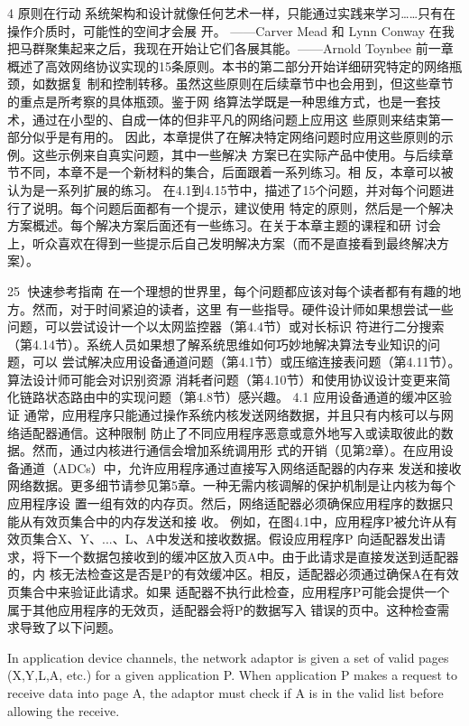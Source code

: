 4 原则在行动
系统架构和设计就像任何艺术一样，只能通过实践来学习……只有在操作介质时，可能性的空间才会展
开。
——Carver Mead 和 Lynn Conway
在我把马群聚集起来之后，我现在开始让它们各展其能。——Arnold Toynbee
前一章概述了高效网络协议实现的15条原则。本书的第二部分开始详细研究特定的网络瓶颈，如数据复
制和控制转移。虽然这些原则在后续章节中也会用到，但这些章节的重点是所考察的具体瓶颈。鉴于网
络算法学既是一种思维方式，也是一套技术，通过在小型的、自成一体的但非平凡的网络问题上应用这
些原则来结束第一部分似乎是有用的。
因此，本章提供了在解决特定网络问题时应用这些原则的示例。这些示例来自真实问题，其中一些解决
方案已在实际产品中使用。与后续章节不同，本章不是一个新材料的集合，后面跟着一系列练习。相
反，本章可以被认为是一系列扩展的练习。
在4.1到4.15节中，描述了15个问题，并对每个问题进行了说明。每个问题后面都有一个提示，建议使用
特定的原则，然后是一个解决方案概述。每个解决方案后面还有一些练习。在关于本章主题的课程和研
讨会上，听众喜欢在得到一些提示后自己发明解决方案（而不是直接看到最终解决方案）。

                                                  25
快速参考指南
在一个理想的世界里，每个问题都应该对每个读者都有有趣的地方。然而，对于时间紧迫的读者，这里
有一些指导。硬件设计师如果想尝试一些问题，可以尝试设计一个以太网监控器（第4.4节）或对长标识
符进行二分搜索（第4.14节）。系统人员如果想了解系统思维如何巧妙地解决算法专业知识的问题，可以
尝试解决应用设备通道问题（第4.1节）或压缩连接表问题（第4.11节）。算法设计师可能会对识别资源
消耗者问题（第4.10节）和使用协议设计变更来简化链路状态路由中的实现问题（第4.8节）感兴趣。
4.1 应用设备通道的缓冲区验证
通常，应用程序只能通过操作系统内核发送网络数据，并且只有内核可以与网络适配器通信。这种限制
防止了不同应用程序恶意或意外地写入或读取彼此的数据。然而，通过内核进行通信会增加系统调用形
式的开销（见第2章）。在应用设备通道（ADCs）中，允许应用程序通过直接写入网络适配器的内存来
发送和接收网络数据。更多细节请参见第5章。一种无需内核调解的保护机制是让内核为每个应用程序设
置一组有效的内存页。然后，网络适配器必须确保应用程序的数据只能从有效页集合中的内存发送和接
收。
例如，在图4.1中，应用程序P被允许从有效页集合X、Y、...、L、A中发送和接收数据。假设应用程序P
向适配器发出请求，将下一个数据包接收到的缓冲区放入页A中。由于此请求是直接发送到适配器的，内
核无法检查这是否是P的有效缓冲区。相反，适配器必须通过确保A在有效页集合中来验证此请求。如果
适配器不执行此检查，应用程序P可能会提供一个属于其他应用程序的无效页，适配器会将P的数据写入
错误的页中。这种检查需求导致了以下问题。




In application device channels, the network adaptor is given a set of valid pages (X,Y,L,A, etc.)
for a given application P. When application P makes a request to receive data into page A, the
adaptor must check if A is in the valid list before allowing the receive.

